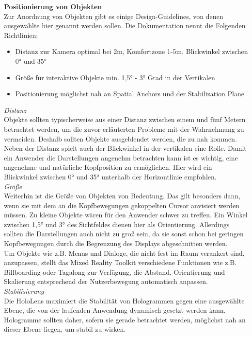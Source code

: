 \textbf{Positionierung von Objekten}\\
Zur Anordnung von Objekten gibt es einige Design-Guidelines, von denen ausgewählte hier genannt werden sollen. Die Dokumentation nennt die Folgenden Richtlinien:
\begin{itemize}
	\setlength{\itemsep}{-1pt}
	\singlespacing
	\item Distanz zur Kamera optimal bei 2m, Komfortzone 1-5m, Blickwinkel zwischen 0° und 35°
	\item Größe für interaktive Objekte min. 1,5° - 3° Grad in der Vertikalen
	\item Positionierung möglichst nah an Spatial Anchors und der Stabilization Plane
\end{itemize}

\textit{Distanz}\\
Objekte sollten typischerweise aus einer Distanz zwischen einem und fünf Metern betrachtet werden, um die zuvor erläuterten Probleme mit der Wahrnehmung zu vermeiden. Deshalb sollten Objekte ausgeblendet werden, die zu nah kommen. Neben der Distanz spielt auch der Blickwinkel in der vertikalen eine Rolle. Damit ein Anwender die Darstellungen angenehm betrachten kann ist es wichtig, eine angenehme und natürliche Kopfposition zu ermöglichen. Hier wird ein Blickwinkel zwischen 0° und 35° unterhalb der Horizontlinie empfohlen.\\

\textit{Größe}\\
Weiterhin ist die Größe von Objekten von Bedeutung. Das gilt besonders dann, wenn sie mit dem an die Kopfbewegungen gekoppelten Cursor anvisiert werden müssen. Zu kleine Objekte wären für den Anwender schwer zu treffen. Ein Winkel zwischen 1,5° und 3° des Sichtfeldes dienen hier als Orientierung. Allerdings sollten die Darstellungen auch nicht zu groß sein, da sie sonst schon bei geringen Kopfbewegungen durch die Begrenzung des Displays abgeschnitten werden.\\

Um Objekte wie z.B. Menus und Dialoge, die nicht fest im Raum verankert sind, anzupassen, stellt das Mixed Reality Toolkit verschiedene Funktionen wie z.B. Billboarding oder Tagalong zur Verfügung, die Abstand, Orientierung und Skalierung entsprechend der Nutzerbewegung automatisch anpassen.\\

\textit{Stabilisierung}\\
Die HoloLens maximiert die Stabilität von Hologrammen gegen eine ausgewählte Ebene, die von der laufenden Anwendung dynamisch gesetzt werden kann. Hologramme sollten daher, sofern sie gerade betrachtet werden, möglichst nah an dieser Ebene liegen, um stabil zu wirken.\\

